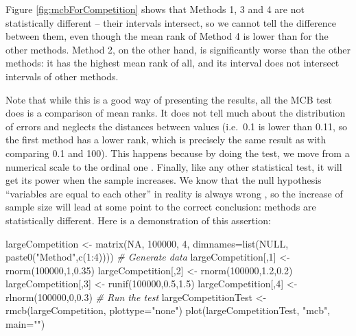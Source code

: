 \documentclass[
]{book}
\newenvironment{Shaded}{\begin{snugshade}}{\end{snugshade}}
\newcommand{\AttributeTok}[1]{\textcolor[rgb]{0.77,0.63,0.00}{#1}}
\newcommand{\CommentTok}[1]{\textcolor[rgb]{0.56,0.35,0.01}{\textit{#1}}}
\newcommand{\ConstantTok}[1]{\textcolor[rgb]{0.00,0.00,0.00}{#1}}
\newcommand{\DecValTok}[1]{\textcolor[rgb]{0.00,0.00,0.81}{#1}}
\newcommand{\FloatTok}[1]{\textcolor[rgb]{0.00,0.00,0.81}{#1}}
\newcommand{\FunctionTok}[1]{\textcolor[rgb]{0.00,0.00,0.00}{#1}}
\newcommand{\NormalTok}[1]{#1}
\newcommand{\OtherTok}[1]{\textcolor[rgb]{0.56,0.35,0.01}{#1}}
\newcommand{\SpecialCharTok}[1]{\textcolor[rgb]{0.00,0.00,0.00}{#1}}
\newcommand{\StringTok}[1]{\textcolor[rgb]{0.31,0.60,0.02}{#1}}
\theoremstyle{definition}
\theoremstyle{definition}
\theoremstyle{definition}
\theoremstyle{definition}
\theoremstyle{remark}
\begin{document}
Figure \ref{fig:mcbForCompetition} shows that Methods 1, 3 and 4 are not statistically different -- their intervals intersect, so we cannot tell the difference between them, even though the mean rank of Method 4 is lower than for the other methods. Method 2, on the other hand, is significantly worse than the other methods: it has the highest mean rank of all, and its interval does not intersect intervals of other methods.

Note that while this is a good way of presenting the results, all the MCB test does is a comparison of mean ranks. It does not tell much about the distribution of errors and neglects the distances between values (i.e.~0.1 is lower than 0.11, so the first method has a lower rank, which is precisely the same result as with comparing 0.1 and 100). This happens because by doing the test, we move from a numerical scale to the ordinal one \citep[see Section 1.2 of][]{SvetunkovSBA}. Finally, like any other statistical test, it will get its power when the sample increases. We know that the null hypothesis ``variables are equal to each other'' in reality is always wrong \citep[see Section 5.3 of][]{SvetunkovSBA}, so the increase of sample size will lead at some point to the correct conclusion: methods are statistically different. Here is a demonstration of this assertion:

\begin{Shaded}
\begin{Highlighting}[]
\NormalTok{largeCompetition }\OtherTok{\textless{}{-}} 
  \FunctionTok{matrix}\NormalTok{(}\ConstantTok{NA}\NormalTok{, }\DecValTok{100000}\NormalTok{, }\DecValTok{4}\NormalTok{,}
         \AttributeTok{dimnames=}\FunctionTok{list}\NormalTok{(}\ConstantTok{NULL}\NormalTok{, }\FunctionTok{paste0}\NormalTok{(}\StringTok{"Method"}\NormalTok{,}\FunctionTok{c}\NormalTok{(}\DecValTok{1}\SpecialCharTok{:}\DecValTok{4}\NormalTok{))))}
\CommentTok{\# Generate data}
\NormalTok{largeCompetition[,}\DecValTok{1}\NormalTok{] }\OtherTok{\textless{}{-}} \FunctionTok{rnorm}\NormalTok{(}\DecValTok{100000}\NormalTok{,}\DecValTok{1}\NormalTok{,}\FloatTok{0.35}\NormalTok{)}
\NormalTok{largeCompetition[,}\DecValTok{2}\NormalTok{] }\OtherTok{\textless{}{-}} \FunctionTok{rnorm}\NormalTok{(}\DecValTok{100000}\NormalTok{,}\FloatTok{1.2}\NormalTok{,}\FloatTok{0.2}\NormalTok{)}
\NormalTok{largeCompetition[,}\DecValTok{3}\NormalTok{] }\OtherTok{\textless{}{-}} \FunctionTok{runif}\NormalTok{(}\DecValTok{100000}\NormalTok{,}\FloatTok{0.5}\NormalTok{,}\FloatTok{1.5}\NormalTok{)}
\NormalTok{largeCompetition[,}\DecValTok{4}\NormalTok{] }\OtherTok{\textless{}{-}} \FunctionTok{rlnorm}\NormalTok{(}\DecValTok{100000}\NormalTok{,}\DecValTok{0}\NormalTok{,}\FloatTok{0.3}\NormalTok{)}
\CommentTok{\# Run the test}
\NormalTok{largeCompetitionTest }\OtherTok{\textless{}{-}} \FunctionTok{rmcb}\NormalTok{(largeCompetition, }\AttributeTok{plottype=}\StringTok{"none"}\NormalTok{)}
\FunctionTok{plot}\NormalTok{(largeCompetitionTest, }\StringTok{"mcb"}\NormalTok{, }\AttributeTok{main=}\StringTok{""}\NormalTok{)}
\end{Highlighting}
\end{Shaded}
\end{document}
